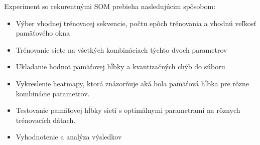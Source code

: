 Experiment so rekurentnými SOM prebieha nasledujúcim spôsobom:
\begin{itemize}
    \item Výber vhodnej trénovacej sekvencie, počtu epôch trénovania a vhodnú veľkosť pamäťového okna
    \item Trénovanie siete na všetkých kombináciach týchto dvoch parametrov
    \item Ukladanie hodnot pamäťovej hĺbky a kvantizačných chýb do súboru
    \item Vykreslenie heatmapy, ktorá znázorňuje aká bola pamäťová hĺbka pre rôzne kombinácie parametrov.
    \item Testovanie pamäťovej hĺbky sietí s optimálnymi parametrami na rôznych trénovacích dátach.
    \item Vyhodnotenie a analýza výsledkov
\end{itemize}







